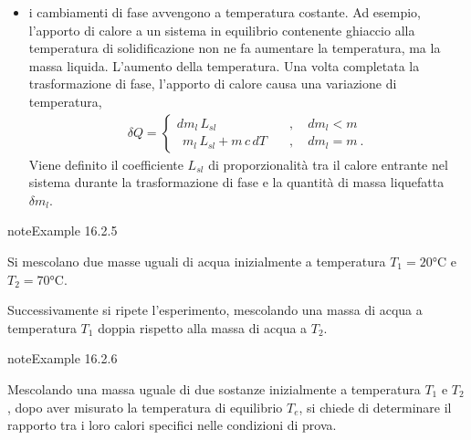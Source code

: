 \documentclass[letterpaper,10pt,italian]{jupyterBook}
\begin{document}
\begin{itemize}
\item {} 
\sphinxAtStartPar
i cambiamenti di fase avvengono a temperatura costante. Ad esempio, l’apporto di calore a un sistema in equilibrio contenente ghiaccio alla temperatura di solidificazione non ne fa aumentare la temperatura, ma la massa liquida. L’aumento della temperatura. Una volta completata la trasformazione di fase, l’apporto di calore causa una variazione di temperatura,
\begin{equation*}
\begin{split}\delta Q = \begin{cases}
      d m_{l} \, L_{sl}                 \quad & , \quad {d m_l < m} \\
    \ \ m_{l} \, L_{sl} + m \, c \, d T \quad & , \quad {d m_l = m} \ .
    \end{cases}\end{split}
\end{equation*}
\sphinxAtStartPar
Viene definito  il coefficiente \(L_{sl}\) di proporzionalità tra il calore entrante nel sistema durante la trasformazione di fase e la quantità di massa liquefatta \(\delta m_l\).

\end{itemize}
\label{ch/thermodynamics/foundation-experiments:thermodynamics:history:heat-capacity:1}
\begin{sphinxadmonition}{note}{Example 16.2.5}



\sphinxAtStartPar
Si mescolano due masse uguali di acqua inizialmente a temperatura \(T_1 = 20 \text{°C}\) e \(T_2 = 70 \text{°C}\).

\sphinxAtStartPar
Successivamente si ripete l’esperimento, mescolando una massa di acqua a temperatura \(T_1\) doppia rispetto alla massa di acqua a \(T_2\).
\end{sphinxadmonition}
\label{ch/thermodynamics/foundation-experiments:thermodynamics:history:heat-capacity:2}
\begin{sphinxadmonition}{note}{Example 16.2.6}



\sphinxAtStartPar
Mescolando una massa uguale di due sostanze inizialmente a temperatura \(T_1\)  e \(T_2\), dopo aver misurato la temperatura di equilibrio \(T_e\), si chiede di determinare il rapporto tra i loro calori specifici nelle condizioni di prova.
\end{sphinxadmonition}
\label{ch/thermodynamics/foundation-experiments:thermodynamics:history:heat-capacity:3}
\end{document}
